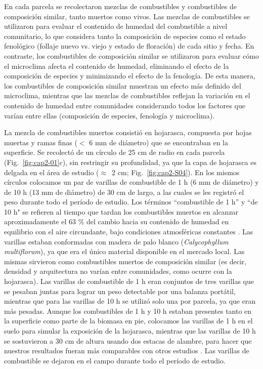 En cada parcela se recolectaron mezclas de combustibles y combustibles de composición similar, tanto muertos como vivos. Las mezclas de combustibles se utilizaron para evaluar el contenido de humedad del combustible a nivel comunitario, lo que considera tanto la composición de especies como el estado fenológico (follaje nuevo vs. viejo y estado de floración) de cada sitio y fecha. En contraste, los combustibles de composición similar se utilizaron para evaluar cómo el microclima afecta el contenido de humedad, eliminando el efecto de la composición de especies y minimizando el efecto de la fenología. De esta manera, los combustibles de composición similar muestran un efecto más definido del microclima, mientras que las mezclas de combustibles reflejan la variación en el contenido de humedad entre comunidades considerando todos los factores que varían entre ellas (composición de especies, fenología y microclima).

La mezcla de combustibles muertos consistió en hojarasca, compuesta por hojas muertas y ramas finas ($<$ 6 mm de diámetro) que se encontraban en la superficie. Se recolectó de un círculo de 25 cm de radio en cada parcela (Fig.~\ref{fig:cap2-01}c), sin restringir su profundidad, ya que la capa de hojarasca es delgada en el área de estudio ($\approx$~2 cm; Fig.~\ref{fig:cap2-S04}). En los mismos círculos colocamos un par de varillas de combustible de 1 h (6 mm de diámetro) y de 10 h (13 mm de diámetro) de 30 cm de largo, a las cuales se les registró el peso durante todo el período de estudio. Los términos “combustible de 1 h” y “de 10 h" se refieren al tiempo que tardan los combustibles muertos en alcanzar aproximadamente el 63 \% del cambio hacia su contenido de humedad en equilibrio con el aire circundante, bajo condiciones atmosféricas constantes \citep{deeming1977nfdrs}. Las varillas estaban conformadas con madera de palo blanco (\textit{Calycophyllum multiflorum}), ya que era el único material disponible en el mercado local. Las mismas sirvieron como combustibles muertos de composición similar (es decir, densidad y arquitectura no varían entre comunidades, como ocurre con la hojarasca). Las varillas de combustible de 1 h eran conjuntos de tres varillas que se pesaban juntas para lograr un peso detectable por una balanza portátil, mientras que para las varillas de 10 h se utilizó solo una por parcela, ya que eran más pesadas. Aunque los combustibles de 1 h y 10 h estaban presentes tanto en la superficie como parte de la biomasa en pie, colocamos las varillas de 1 h en el suelo para simular la exposición de la hojarasca, mientras que las varillas de 10 h se sostuvieron a 30 cm de altura usando dos estacas de alambre, para hacer que nuestros resultados fueran más comparables con otros estudios \citep{cawson_estimation_2020}. Las varillas de combustible se dejaron en el campo durante todo el período de estudio.

